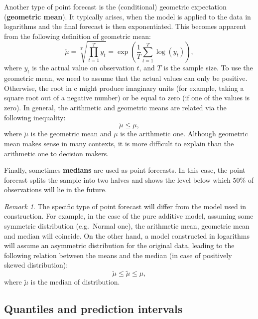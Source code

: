 \documentclass[]{book}
\theoremstyle{definition}
\theoremstyle{definition}
\theoremstyle{definition}
\theoremstyle{definition}
\theoremstyle{remark}
\newtheorem*{remark}{Remark}
\begin{document}
Another type of point forecast is the (conditional) geometric expectation (\textbf{geometric mean}). It typically arises, when the model is applied to the data in logarithms and the final forecast is then exponentiated. This becomes apparent from the following definition of geometric mean:
\begin{equation}
    \check{\mu} = \sqrt[T]{\prod_{t=1}^T y_t} = \exp \left(\frac{1}{T} \sum_{t=1}^T \log(y_t) \right) ,
    \label{eq:GeoMean}
\end{equation}
where \(y_t\) is the actual value on observation \(t\), and \(T\) is the sample size. To use the geometric mean, we need to assume that the actual values can only be positive. Otherwise, the root in c might produce imaginary units (for example, taking a square root out of a negative number) or be equal to zero (if one of the values is zero). In general, the arithmetic and geometric means are related via the following inequality:
\begin{equation}
    \check{\mu} \leq \mu ,
    \label{eq:GeoAndArithMeans}
\end{equation}
where \(\check{\mu}\) is the geometric mean and \(\mu\) is the arithmetic one. Although geometric mean makes sense in many contexts, it is more difficult to explain than the arithmetic one to decision makers.

Finally, sometimes \textbf{medians} are used as point forecasts. In this case, the point forecast splits the sample into two halves and shows the level below which 50\% of observations will lie in the future.

\begin{remark}
The specific type of point forecast will differ from the model used in construction. For example, in the case of the pure additive model, assuming some symmetric distribution (e.g.~Normal one), the arithmetic mean, geometric mean and median will coincide. On the other hand, a model constructed in logarithms will assume an asymmetric distribution for the original data, leading to the following relation between the means and the median (in case of positively skewed distribution):
\begin{equation}
    \check{\mu} \leq \tilde{\mu} \leq \mu ,
    \label{eq:GeoAndArithMeansAndMedian}
\end{equation}
where \(\tilde{\mu}\) is the median of distribution.
\end{remark}

\hypertarget{typesOfForecastsInterval}{%
\subsection{Quantiles and prediction intervals}\label{typesOfForecastsInterval}}
\end{document}
